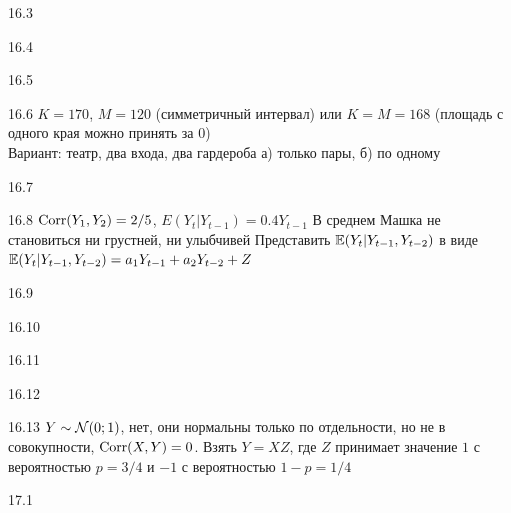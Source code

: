 \protect \hypertarget {soln:16.3}{}
\begin{solution}{{16.3}}
  \autocite{mukherjee2017proof}
\end{solution}
\protect \hypertarget {soln:16.4}{}
\begin{solution}{{16.4}}
\end{solution}
\protect \hypertarget {soln:16.5}{}
\begin{solution}{{16.5}}
\end{solution}
\protect \hypertarget {soln:16.6}{}
\begin{solution}{{16.6}}
  $K=170$, $M=120$ (симметричный интервал) или $K=M=168$ (площадь с одного края можно принять за 0) \\
  Вариант: театр, два входа, два гардероба а) только пары, б) по одному
\end{solution}
\protect \hypertarget {soln:16.7}{}
\begin{solution}{{16.7}}
\end{solution}
\protect \hypertarget {soln:16.8}{}
\begin{solution}{{16.8}}
  $\operatorname{Corr}(Y_1, Y_2) = 2/5$, $E(Y_t | Y_{t-1}) = 0.4 Y_{t-1}$
  В среднем Машка не становиться ни грустней, ни улыбчивей
  Представить $\mathbb{E}(Y_t | Y_{t-1}, Y_{t-2})$ в виде $\mathbb{E}(Y_t | Y_{t-1}, Y_{t-2}) = a_1 Y_{t-1} + a_2 Y_{t-2} + Z$
\end{solution}
\protect \hypertarget {soln:16.9}{}
\begin{solution}{{16.9}}
\end{solution}
\protect \hypertarget {soln:16.10}{}
\begin{solution}{{16.10}}
\end{solution}
\protect \hypertarget {soln:16.11}{}
\begin{solution}{{16.11}}
\end{solution}
\protect \hypertarget {soln:16.12}{}
\begin{solution}{{16.12}}
\end{solution}
\protect \hypertarget {soln:16.13}{}
\begin{solution}{{16.13}}
$Y \sim \mathcal{N}(0;1)$, нет, они нормальны только по отдельности, но не в совокупности, $\operatorname{Corr}(X,Y)=0$. Взять $Y=XZ$, где $Z$ принимает значение $1$ с вероятностью $p=3/4$ и $-1$ с вероятностью $1-p=1/4$
\end{solution}
\protect \hypertarget {soln:17.1}{}
\begin{solution}{{17.1}}

\end{solution}
\protect \hypertarget {soln:17.2}{}
